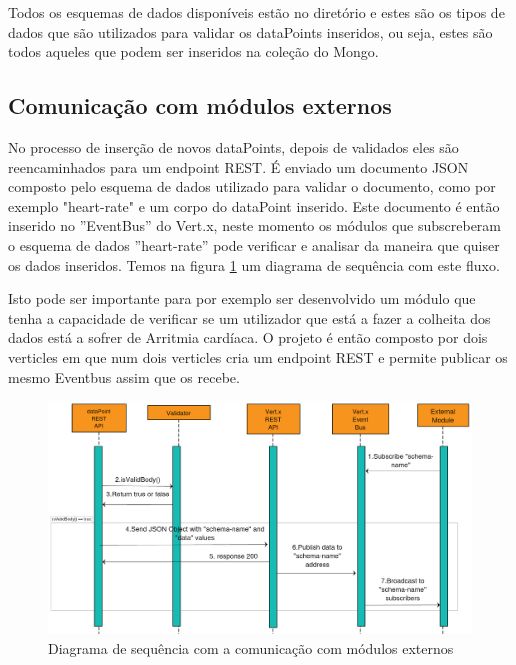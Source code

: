 Todos os esquemas de dados disponíveis estão no diretório \cite{schemas-available} e estes são os tipos de dados que são utilizados para validar os dataPoints inseridos, ou seja, estes são todos aqueles que podem ser inseridos na coleção do Mongo.

\subsection{Comunicação com módulos externos}
No processo de inserção de novos dataPoints, depois de validados eles são reencaminhados para um endpoint \gls{REST}. É enviado um documento \gls{JSON} composto pelo esquema de dados utilizado para validar o documento, como por exemplo "heart-rate" e um corpo do dataPoint inserido. Este documento é então inserido no ''EventBus'' do Vert.x, neste momento os módulos que subscreberam o esquema de dados ''heart-rate'' pode verificar e analisar da maneira que quiser os dados inseridos. Temos na figura \ref{f:toExtSeqDiagram} um diagrama de sequência com este fluxo. \par
Isto pode ser importante para por exemplo ser desenvolvido um módulo que tenha a capacidade de verificar se um utilizador que está a fazer a colheita dos dados está a sofrer de Arritmia cardíaca.
O projeto é então composto por dois verticles em que num dois verticles cria um endpoint \gls{REST} e permite publicar os mesmo Eventbus assim que os recebe.

\begin{figure}[H]
  \centering
  \includegraphics[width=1\textwidth]{imgs/toExtSeqDiagram.png}
  \caption[Diagrama de sequência com a comunicação com módulos externos]{Diagrama de sequência com a comunicação com módulos externos}
  
  \label{f:toExtSeqDiagram}
\end{figure}

